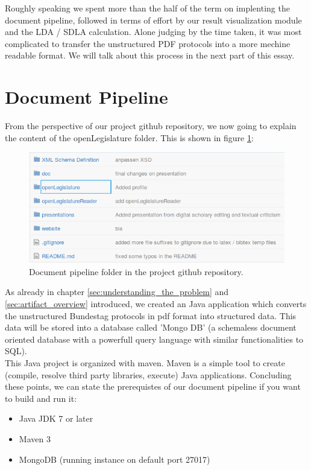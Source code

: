 \documentclass[12pt,paper=a4,nenglish]{scrreprt}
\begin{document}
Roughly speaking we spent more than the half of the term on implenting
the document pipeline, followed in terms of effort by our result visualization
module and the LDA / SDLA calculation. Alone judging by the time taken, it was
most complicated to transfer the unstructured PDF protocols into a more mechine
readable format. We will talk about this process in the next part of this essay. 

\section{Document Pipeline} 
From the perspective of our project github repository, we now going to explain
the content of the openLegislature folder. This is shown in figure
\ref{pic:doc_pipeline_github}: 
\begin{figure}[H] 
	\centering
	\includegraphics[scale=0.7]{res/document_pipeline.png}
	\caption{Document pipeline folder in the project github repository.}%
	\label{pic:doc_pipeline_github}%
\end{figure}%
As already in chapter \ref{sec:understanding_the_problem} and
\ref{sec:artifact_overview} introduced, we created an Java application which
converts the unstructured Bundestag protocols in pdf format into structured
data. This data will be stored into a database called 'Mongo DB' (a
schemaless document oriented database with a powerfull query language with
similar functionalities to SQL). \\
This Java project is organized with maven. 
Maven is a simple tool to create (compile, resolve third party libraries,
execute) Java applications. Concluding these points, we can state the
prerequistes of our document pipeline if you want to build and run it:
\begin{itemize}
  \item Java JDK 7 or later
  \item Maven 3
  \item MongoDB (running instance on default port 27017) 
\end{itemize}
\end{document}
